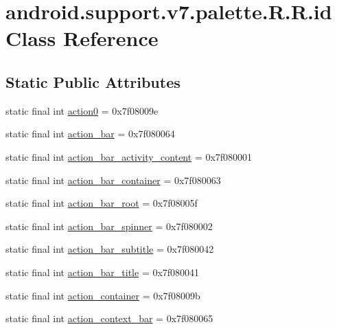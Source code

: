 \hypertarget{classandroid_1_1support_1_1v7_1_1palette_1_1_r_1_1id}{
\section{android.support.v7.palette.R.R.id Class Reference}
\label{classandroid_1_1support_1_1v7_1_1palette_1_1_r_1_1id}
}
\subsection*{Static Public Attributes}
\begin{CompactItemize}
\item 
static final int \hyperlink{classandroid_1_1support_1_1v7_1_1palette_1_1_r_1_1id_5747c4fd061cae0ee559522ab9a1da4f}{action0} = 0x7f08009e
\item 
static final int \hyperlink{classandroid_1_1support_1_1v7_1_1palette_1_1_r_1_1id_2c66ef5f99f38e69d989475d6f5c16c6}{action\_\-bar} = 0x7f080064
\item 
static final int \hyperlink{classandroid_1_1support_1_1v7_1_1palette_1_1_r_1_1id_38973502df082949c9721beb0e9618c6}{action\_\-bar\_\-activity\_\-content} = 0x7f080001
\item 
static final int \hyperlink{classandroid_1_1support_1_1v7_1_1palette_1_1_r_1_1id_2b1100dc07132a05fdb6d63c568a14fb}{action\_\-bar\_\-container} = 0x7f080063
\item 
static final int \hyperlink{classandroid_1_1support_1_1v7_1_1palette_1_1_r_1_1id_0b712efc5457f1ceea82a4c726c3e407}{action\_\-bar\_\-root} = 0x7f08005f
\item 
static final int \hyperlink{classandroid_1_1support_1_1v7_1_1palette_1_1_r_1_1id_a2cf84b20d0f7d70502c69df67ee513f}{action\_\-bar\_\-spinner} = 0x7f080002
\item 
static final int \hyperlink{classandroid_1_1support_1_1v7_1_1palette_1_1_r_1_1id_8a5f6b01aeed84cffb51b8df06619e91}{action\_\-bar\_\-subtitle} = 0x7f080042
\item 
static final int \hyperlink{classandroid_1_1support_1_1v7_1_1palette_1_1_r_1_1id_a38e121716223ecf233abd08fca302f7}{action\_\-bar\_\-title} = 0x7f080041
\item 
static final int \hyperlink{classandroid_1_1support_1_1v7_1_1palette_1_1_r_1_1id_06bece9781f98724f00c0eef4bb8c6d4}{action\_\-container} = 0x7f08009b
\item 
static final int \hyperlink{classandroid_1_1support_1_1v7_1_1palette_1_1_r_1_1id_e5015ad39269f204a55a4d2ab7f18846}{action\_\-context\_\-bar} = 0x7f080065

\end{CompactItemize}

